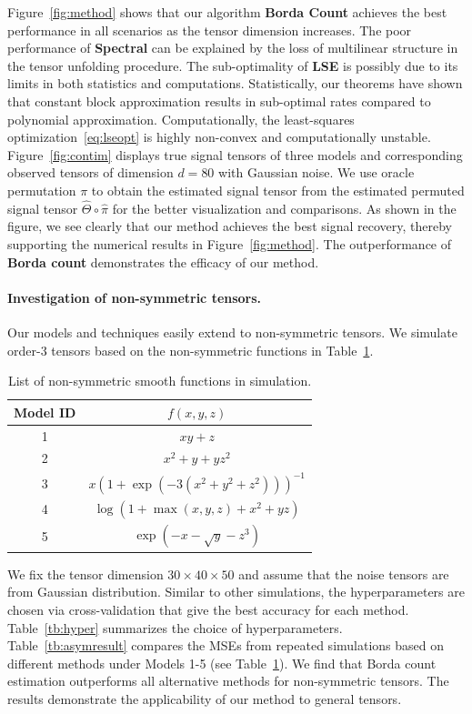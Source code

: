\documentclass[11pt]{article}
\theoremstyle{definition}
\begin{document}
Figure~\ref{fig:method} shows that our algorithm {\bf \small Borda Count} achieves the best performance in all scenarios as the tensor dimension increases. The poor performance of {\bf \small Spectral} can be explained by the loss of multilinear structure in the tensor unfolding procedure. The sub-optimality of {\bf \small LSE} is possibly due to its limits in both statistics and computations. Statistically, our theorems have shown that constant block approximation results in sub-optimal rates compared to polynomial approximation. Computationally, the least-squares optimization~\eqref{eq:lseopt} is highly non-convex and computationally unstable. 
Figure~\ref{fig:contim} displays true signal tensors of three models and corresponding observed tensors of dimension $d = 80$ with Gaussian noise. We use oracle permutation $\pi$ to obtain the estimated signal tensor from the estimated permuted signal tensor $\hat\Theta\circ\hat\pi$ for the better visualization and comparisons. As shown in the figure, we see clearly that our method achieves the best signal recovery, thereby supporting the numerical results in Figure~\ref{fig:method}.
The outperformance of {\bf \small Borda count} demonstrates the efficacy of our method.


\paragraph{Investigation of non-symmetric tensors.}\label{sec:asym}
Our models and techniques easily extend to non-symmetric tensors. We simulate order-3 tensors based on the non-symmetric functions in Table~\ref{tb:md2}. 

\begin{table}[ht]
    \centering
    \begin{tabular}{c|c}
        Model ID  &  $f(x,y,z)$  \\\hline
        1 &    $xy+z$ \\
        2&  $x^2+y +yz^2$\\
        3 & $x(1+\exp(-3(x^2+y^2+z^2)))^{-1}$\\
        4 & $\log(1+\max(x,y,z)+x^2+yz)$ \\
        5 &  $\exp\left(-x-\sqrt{y}-z^3\right)$
    \end{tabular}
    \caption{List of non-symmetric smooth functions in simulation.}
    \label{tb:md2}
\end{table}


We fix the tensor dimension ${30\times40\times 50}$ and assume that the noise tensors are from Gaussian distribution. Similar to other simulations, the hyperparameters are chosen via cross-validation that give the best accuracy for each method. Table~\ref{tb:hyper} summarizes the choice of hyperparameters.  Table~\ref{tb:asymresult} compares the MSEs from repeated simulations based on different methods under Models 1-5 (see Table~\ref{tb:md2}). We find that Borda count estimation outperforms all alternative methods for non-symmetric tensors. The results demonstrate the applicability of our method to general tensors. 
\end{document}
